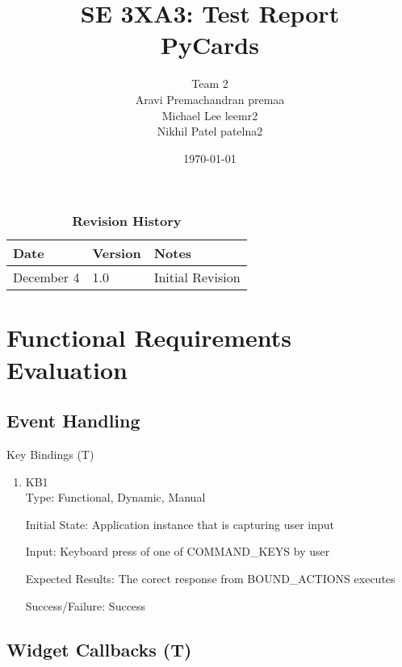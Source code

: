 \documentclass[12pt, titlepage]{article}
\title{SE 3XA3: Test Report\\PyCards}
\author{Team 2
		\\ Aravi Premachandran premaa
		\\ Michael Lee  leemr2
		\\ Nikhil Patel  patelna2
}
\date{\today}
\newcounter{tnum}
\newcommand{\tthetnum}{T\thetnum}
\begin{document}
\maketitle

\tableofcontents
\listoftables

\begin{table}[bp]
\caption{\bf Revision History}
\begin{tabularx}{\textwidth}{p{3cm}p{2cm}X}
\toprule {\bf Date} & {\bf Version} & {\bf Notes}\\
\midrule
December 4 & 1.0 & Initial Revision\\
\bottomrule
\end{tabularx}
\end{table}

\newpage
{}


\section{Functional Requirements Evaluation}

	\subsection{Event Handling}
	
	\begin{description}
		\item[Key Bindings (\tthetnum \label{tKeys})]
	\end{description}
	

	\begin{enumerate}
		\item{KB1\\}
		Type: Functional, Dynamic, Manual
		
		Initial State: Application instance that is capturing user input
		
		Input: Keyboard press of one of COMMAND\_KEYS by user
		
		Expected Results: The corect response from BOUND\_ACTIONS executes 

		Success/Failure: Success
		
	\end{enumerate}
	
	 \label{tClick}
	\subsection{Widget Callbacks (\tthetnum)}
	
\end{document}
